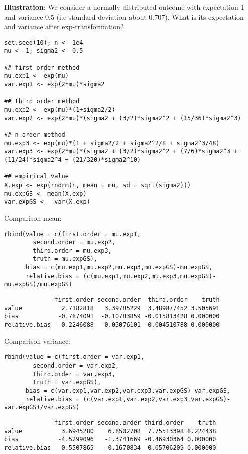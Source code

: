 \documentclass[12pt]{article}
\begin{document}
\textbf{Illustration}: We consider a normally distributed outcome with
expectation 1 and variance 0.5 (i.e standard deviation about 0.707). What is its expectation and variance
after exp-transformation?
\lstset{language=r,label= ,caption= ,captionpos=b,numbers=none}
\begin{lstlisting}
set.seed(10); n <- 1e4
mu <- 1; sigma2 <- 0.5

## first order method
mu.exp1 <- exp(mu)
var.exp1 <- exp(2*mu)*sigma2

## third order method
mu.exp2 <- exp(mu)*(1+sigma2/2)
var.exp2 <- exp(2*mu)*(sigma2 + (3/2)*sigma2^2 + (15/36)*sigma2^3)

## n order method
mu.exp3 <- exp(mu)*(1 + sigma2/2 + sigma2^2/8 + sigma2^3/48)
var.exp3 <- exp(2*mu)*(sigma2 + (3/2)*sigma2^2 + (7/6)*sigma2^3 + (11/24)*sigma2^4 + (21/320)*sigma2^10)

## empirical value
X.exp <- exp(rnorm(n, mean = mu, sd = sqrt(sigma2)))
mu.expGS <- mean(X.exp)
var.expGS <-  var(X.exp)
\end{lstlisting}

\clearpage

Comparison mean:
\lstset{language=r,label= ,caption= ,captionpos=b,numbers=none}
\begin{lstlisting}
rbind(value = c(first.order = mu.exp1, 
		second.order = mu.exp2, 
		third.order = mu.exp3, 
		truth = mu.expGS),
      bias = c(mu.exp1,mu.exp2,mu.exp3,mu.expGS)-mu.expGS,
      relative.bias = (c(mu.exp1,mu.exp2,mu.exp3,mu.expGS)-mu.expGS)/mu.expGS)
\end{lstlisting}

\begin{verbatim}
              first.order second.order  third.order    truth
value           2.7182818   3.39785229  3.489877452 3.505691
bias           -0.7874091  -0.10783859 -0.015813428 0.000000
relative.bias  -0.2246088  -0.03076101 -0.004510788 0.000000
\end{verbatim}

Comparison variance:
\lstset{language=r,label= ,caption= ,captionpos=b,numbers=none}
\begin{lstlisting}
rbind(value = c(first.order = var.exp1, 
		second.order = var.exp2, 
		third.order = var.exp3, 
		truth = var.expGS),
      bias = c(var.exp1,var.exp2,var.exp3,var.expGS)-var.expGS,
      relative.bias = (c(var.exp1,var.exp2,var.exp3,var.expGS)-var.expGS)/var.expGS)
\end{lstlisting}

\begin{verbatim}
              first.order second.order third.order    truth
value           3.6945280    6.8502708  7.75513398 8.224438
bias           -4.5299096   -1.3741669 -0.46930364 0.000000
relative.bias  -0.5507865   -0.1670834 -0.05706209 0.000000
\end{verbatim}
\end{document}
